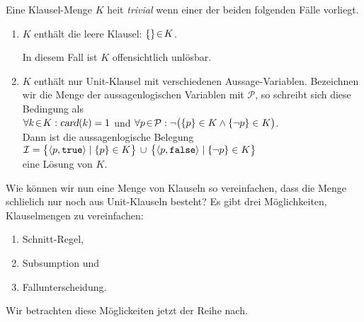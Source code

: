 \begin{Definition}
  Eine Klausel-Menge $K$ hei\3t \emph{trivial} wenn einer der beiden folgenden F\"{a}lle
  vorliegt.
  \begin{enumerate}
  \item $K$ enth\"{a}lt die leere Klausel: $\{\} \!\in\! K$.

        In diesem Fall ist $K$ offensichtlich unl\"{o}sbar.
  \item $K$ enth\"{a}lt nur Unit-Klausel mit verschiedenen Aussage-Variablen.
        Bezeichnen wir die Menge der aussagenlogischen Variablen mit $\mathcal{P}$,
        so schreibt sich diese Bedingung als 
        \\[0.3cm]
        \hspace*{1.3cm}
        $\forall k \!\in\! K: \textsl{card}(k) = 1$ \quad und \quad
        $\forall p \!\in\! \mathcal{P}: \neg\bigl( \{p\} \in K \wedge \{\neg p\} \in K\bigr)$.
        \\[0.3cm]
        Dann ist die aussagenlogische Belegung
        \\[0.2cm]
        \hspace*{1.3cm}
        $ \I = \bigl\{ \pair(p, \mathtt{true}) \mid \{p\} \in K \bigr\} \,\cup\, \bigl\{
             \pair(p, \mathtt{false}) \mid \{\neg p\} \in K \bigr\} 
        $
        \\[0.2cm]
        eine L\"{o}sung von $K$. \eox
  \end{enumerate}
\end{Definition}


Wie k\"{o}nnen wir nun eine Menge von Klauseln so vereinfachen, dass die Menge schlie\3lich nur
noch aus Unit-Klauseln besteht?  Es gibt drei
M\"{o}glichkeiten, Klauselmengen zu vereinfachen:
\begin{enumerate}
\item Schnitt-Regel,
\item Subsumption und
\item Fallunterscheidung.
\end{enumerate}
Wir betrachten diese M\"{o}glickeiten jetzt der Reihe nach.

